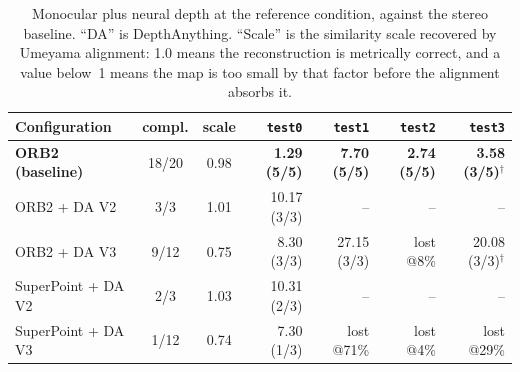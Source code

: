 \begin{table}[H]
\centering
\caption{Monocular plus neural depth at the reference condition, against the stereo baseline. ``DA'' is DepthAnything. ``Scale'' is the similarity scale recovered by Umeyama alignment: 1.0 means the reconstruction is metrically correct, and a value below~1 means the map is too small by that factor before the alignment absorbs it.}
\label{tab:sw-depth}
\footnotesize
\setlength{\tabcolsep}{4pt}
\begin{tabular}{@{}lccrrrr@{}}
\toprule
\textbf{Configuration} & \textbf{compl.} & \textbf{scale} & \texttt{test0} & \texttt{test1} & \texttt{test2} & \texttt{test3} \\
\midrule
\textbf{ORB2 (baseline)} & 18/20 & 0.98 & \textbf{1.29 (5/5)} & \textbf{7.70 (5/5)} & \textbf{2.74 (5/5)} & \textbf{3.58 (3/5)$^\dagger$} \\
ORB2 + DA V2 & 3/3 & 1.01 & 10.17 (3/3) & -- & -- & -- \\
ORB2 + DA V3 & 9/12 & 0.75 & 8.30 (3/3) & 27.15 (3/3) & lost @8\% & 20.08 (3/3)$^\dagger$ \\
SuperPoint + DA V2 & 2/3 & 1.03 & 10.31 (2/3) & -- & -- & -- \\
SuperPoint + DA V3 & 1/12 & 0.74 & 7.30 (1/3) & lost @71\% & lost @4\% & lost @29\% \\
\bottomrule
\end{tabular}
\end{table}
